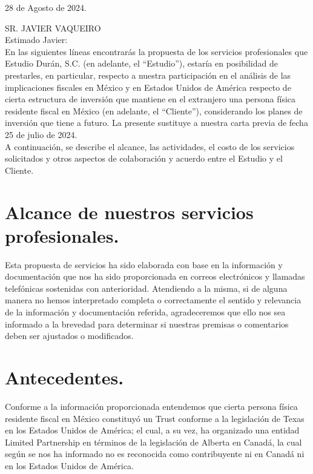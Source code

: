 \documentclass[5pt,letter]{report}
\begin{document}
\begin{flushright}
	28 de Agosto de 2024.
\end{flushright}
SR. JAVIER VAQUEIRO \\[4mm]
Estimado Javier: \\[4mm]
 
En las siguientes líneas encontrarás la propuesta de los servicios profesionales que Estudio 
Durán, S.C. (en adelante, el “Estudio”), estaría en posibilidad de prestarles, en particular, 
respecto a nuestra participación en el análisis de las implicaciones fiscales en México y en 
Estados Unidos de América respecto de cierta estructura de inversión que mantiene en el 
extranjero una persona física residente fiscal en México (en adelante, el “Cliente”), 
considerando los planes de inversión que tiene a futuro. La presente sustituye a nuestra carta 
previa de fecha 25 de julio de 2024. \\ 

A continuación, se describe el alcance, las actividades, el costo de los servicios solicitados y otros 
aspectos de colaboración y acuerdo entre el Estudio y el Cliente.  
 
\section*{Alcance de nuestros servicios profesionales.} %
Esta propuesta de servicios ha sido elaborada con base en la información y documentación que 
nos ha sido proporcionada en correos electrónicos y llamadas telefónicas sostenidas con 
anterioridad. Atendiendo a la misma, si de alguna manera no hemos interpretado completa o 
correctamente el sentido y relevancia de la información y documentación referida, 
agradeceremos que ello nos sea informado a la brevedad para determinar si nuestras premisas 
o comentarios deben ser ajustados o modificados. 
 
\section*{Antecedentes.} %
Conforme a la información proporcionada entendemos que cierta persona física residente fiscal 
en México constituyó un Trust conforme a la legislación de Texas en los Estados Unidos de 
América; el cual, a su vez, ha organizado una entidad Limited Partnership en términos de la 
legislación de Alberta en Canadá, la cual según se nos ha informado no es reconocida como 
contribuyente ni en Canadá ni en los Estados Unidos de América. \\ 
\end{document}

